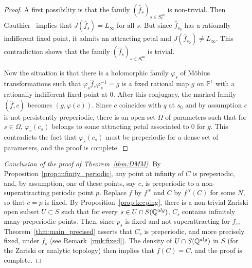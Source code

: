 \documentclass[11 pt, oneside, a4paper]{amsart}
\newcommand{\C}{\mathbb{C}}
\newcommand{\Q}{\mathbb{Q}}
\renewcommand{\P}{\mathbb{P}}
\DeclareMathOperator{\an}{an}
\newcommand{\inv}{^{-1}}
\theoremstyle{definition}
\theoremstyle{definition}
\begin{document}
\begin{proof}
 A first possibility is that  the family $(\hat{f}_s)_{s\in S^{\an}_\C}$ is non-trivial. 
Then Gauthier~\cite[Theorem A]{gauthier:pairs}
implies that 
 $J(\hat{f}_s)  = L_\infty$ for all $s$. But  since  $\hat{f}_{s_0}$ has a rationally indifferent fixed point,   it admits an attracting petal and $J(\hat{f}_{s_0})\neq L_\infty$. This contradiction shows that  the family 
$(\hat{f}_s)_{s\in S^{\an}_\C}$ is trivial. 

Now the situation is that there is a holomorphic family $\varphi_s$ of Möbius transformations 
such that   $ \varphi_s  \hat{f}_s\varphi_s \inv= g$ is  a fixed rational map $g$ on $\P^1$ with a rationally 
 indifferent fixed point at 0. After this conjugacy, the marked family $(\hat{f}, c)$ becomes 
 $(g, \varphi(c))$. Since $c$ coincides with $q$ at $s_0$ and 
  by assumption $c$ is not persistently preperiodic, there is an open set $\Omega$ 
  of parameters such that for $s\in \Omega$, $\varphi_s(c_s)$ belongs to some  attracting petal associated to 0 for $g$. This contradicts the fact that $\varphi_s(c_s)$ must be preperiodic for a dense set of parameters, and the proof is complete. 
\end{proof}


\begin{proof}[Conclusion of the proof of Theorem~\ref{thm:DMM}]
By Proposition~\ref{prop:infinity_periodic}, any point at infinity of $C$ is preperiodic, 
and, by assumption, one of these points, say $c$, is preperiodic to a non-superattracting periodic point $p$. 
Replace $f$ by $f^N$ and $C$ by $f^N(C)$ for some $N$, so that $c=p$ is fixed. By Proposition~\ref{prop:keeping}, there is a 
non-trivial Zariski open subset $U\subset S$ such that for every $s\in U\cap S(\Q^{\rm alg})$, 
$C_s$ contains infinitely many preperiodic points. Then, since $p_s$ is fixed and not superattracting for $f_s$, 
Theorem~\ref{thm:main_precised} asserts that $C_s$ is preperiodic, and more precisely fixed,
under $f_s$ (see Remark~\ref{rmk:fixed}).  The density  of   $U\cap S(\Q^{\rm alg})$ in $S$ 
(for the Zariski or analytic topology) then implies that $f(C) = C$, and the proof is complete. 
\end{proof}


 
 

	 


\end{document}

